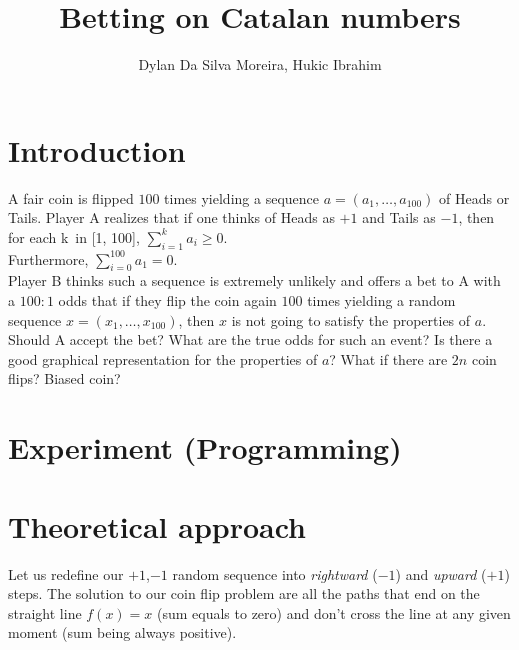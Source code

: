 \documentclass[a4paper,13pt,oneside]{article}
\title{Betting on Catalan numbers}
\author{Dylan Da Silva Moreira, Hukic Ibrahim}
\theoremstyle{remark}
\begin{document}
\maketitle
\newpage
\abstract 

\section{Introduction }

		A fair coin is flipped $100$ times yielding a sequence $a = (a_1,\dots, a_{100})$ of Heads or Tails. Player A realizes that if one thinks of Heads as $+1$ and Tails as $-1$, then for each k\ in [1, 100], $\sum_{i=1}^{k} a_i \geq 0$.
		\\Furthermore, $\sum_{i=0}^{100} a_1=0$.
		\\Player B thinks such a sequence is extremely unlikely and offers a bet to A with a $100 : 1$ odds that if they flip the coin again $100$ times yielding a random sequence $x = (x_1,\dots, x_{100})$, then $x$ is not going to satisfy the properties of $a$. Should A accept the bet? What are the true odds for such an event? Is there a good graphical representation for the properties of $a$? What if there are $2n$ coin flips? Biased coin?
	
\pagebreak
\section{Experiment (Programming)}
\pagebreak
\section{Theoretical approach}


Let us redefine our $+1$,$-1$ random sequence into \textit{rightward} ($-1$) and \textit{upward} ($+1$) steps. The solution to our coin flip problem are all the paths that end on the straight line $f(x) = x$ (sum equals to zero) and don't cross the line at any given moment (sum being always positive).

\bigskip


\begin{center}


\end{center}
\end{document}
